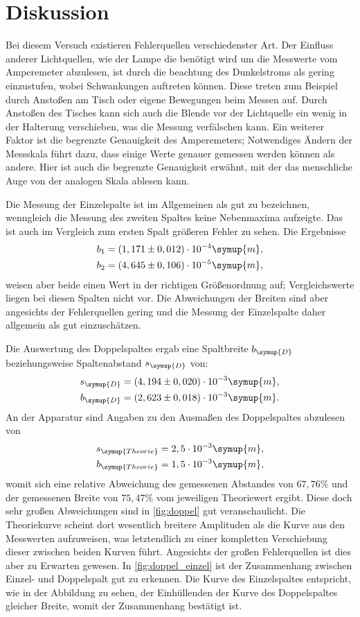 \section{Diskussion}
\label{sec:Diskussion}
Bei diesem Versuch existieren Fehlerquellen verschiedenster Art. Der Einfluss anderer Lichtquellen, wie der Lampe die benötigt wird um 
die Messwerte vom Amperemeter abzulesen, ist durch die beachtung des Dunkelstroms als gering einzustufen, wobei Schwankungen auftreten können.
Diese treten zum Beispiel durch Anstoßen am Tisch oder eigene Bewegungen beim Messen auf. Durch Anstoßen des Tisches kann sich auch die Blende 
vor der Lichtquelle ein wenig in der Halterung verschieben, was die Messung verfälschen kann. Ein weiterer Faktor ist die begrenzte Genauigkeit
des Amperemeters; Notwendiges Ändern der Messskala führt dazu, dass einige Werte genauer gemessen werden können als andere. Hier ist auch die 
begrenzte Genauigkeit erwähnt, mit der das menschliche Auge von der analogen Skala ablesen kann. 

Die Messung der Einzelspalte ist im Allgemeinen als gut zu bezeichnen, wenngleich die Messung des zweiten Spaltes keine Nebenmaxima aufzeigte.
Das ist auch im Vergleich zum ersten Spalt größeren Fehler zu sehen. Die Ergebnisse
\begin{align}
    b_1 &= (1,171 \pm 0,012) \cdot 10^{-4} \symup{m}, \\
    b_2 &= (4,645\pm 0,106) \cdot 10^{-5} \symup{m},
\end{align}
weisen aber beide einen Wert in der richtigen Größenordnung auf; Vergleichswerte liegen bei diesen Spalten nicht vor.
Die Abweichungen der Breiten sind aber angesichts der Fehlerquellen gering und die Messung der Einzelspalte daher allgemein als gut einzuschätzen.

Die Auswertung des Doppelspaltes ergab eine Spaltbreite $b_{\symup{D}}$ beziehungsweise Spaltenabstand $s_{\symup{D}}$ von:
\begin{align}
    s_{\symup{D}} = (4,194 \pm 0,020) \cdot 10^{-3} \symup{m}, \\
    b_{\symup{D}} = (2,623 \pm 0,018) \cdot 10^{-3} \symup{m}.
\end{align}
An der Apparatur sind Angaben zu den Ausmaßen des Doppelspaltes abzulesen von
 \begin{align}
        s_{\symup{Theorie}} = 2,5 \cdot 10^{-3} \symup{m}, \\
        b_{\symup{Theorie}} = 1,5 \cdot 10^{-3} \symup{m},
 \end{align}
womit sich eine relative Abweichung des gemessenen Abstandes von $67,76 \%$ und der gemessenen Breite von $75,47\%$ vom jeweiligen Theoriewert
ergibt. Diese doch sehr großen Abweichungen sind in \autoref{fig:doppel} gut veranschaulicht. Die Theoriekurve scheint dort wesentlich breitere
Amplituden als die Kurve aus den Messwerten aufzuweisen, was letztendlich zu einer kompletten Verschiebung dieser zwischen beiden Kurven führt.
Angesichts der großen Fehlerquellen ist dies aber zu Erwarten gewesen. In \autoref{fig:doppel_einzel} ist der Zusammenhang zwischen Einzel- und 
Doppelspalt gut zu erkennen. Die Kurve des Einzelspaltes entspricht, wie in der Abbildung zu sehen, der Einhüllenden der Kurve des Doppelspaltes 
gleicher Breite, womit der Zusammenhang bestätigt ist.
